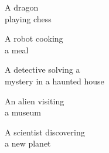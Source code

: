 \begin{figure*}[]
\vspace{1ex}
\begin{minipage}[t]{.025\textwidth}
     \vspace{0pt}
\end{minipage}%
\hspace{1ex}%
\begin{minipage}[t]{0.98\textwidth}
    \vspace{2mm}
    \begin{minipage}[t]{0.2\textwidth}
        \centering
        A dragon\\playing chess
    \end{minipage}%
    \begin{minipage}[t]{0.2\textwidth}
        \centering
        A robot cooking\\a meal
    \end{minipage}%
    \begin{minipage}[t]{0.2\textwidth}
        \centering
        A detective solving a\\mystery in a haunted house
    \end{minipage}%
    \begin{minipage}[t]{0.2\textwidth}
        \centering
        An alien visiting\\a museum
    \end{minipage}%
    \begin{minipage}[t]{0.2\textwidth}
        \centering
        A scientist discovering\\a new planet
    \end{minipage}%
\end{minipage}


\end{figure*}
